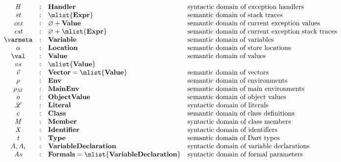\documentclass[a4paper,oneside,fleqn]{article}
\renewcommand{\emptyset}{\varnothing}
\newcommand{\dexpr}{\mathbf{Expr}}
\newcommand{\dhandler}{\mathbf{Handler}}
\newcommand{\denv}{\mathbf{Env}}
\newcommand{\dmenv}{\mathbf{MainEnv}}
\newcommand{\dval}{\mathbf{Value}}
\newcommand{\dlit}{\mathbf{Literal}}
\newcommand{\dvar}{\mathbf{Variable}}
\newcommand{\dvardecl}{\mathbf{VariableDeclaration}}
\newcommand{\dobjval}{\mathbf{ObjectValue}}
\newcommand{\dvector}{\mathbf{Vector}}
\newcommand{\dmember}{\mathbf{Member}}
\newcommand{\dident}{\mathbf{Identifier}}
\newcommand{\idmeta}{\ensuremath{\mathit{X}}}
\newcommand{\dtype}{\mathbf{Type}}
\newcommand{\typemeta}{\ensuremath{\mathit{t}}}
\newcommand{\dclass}{\mathbf{Class}}
\newcommand{\dformals}{\mathbf{Formals}}
\begin{document}
\[\begin{array}{ccll}
    \handler
    & : & \dhandler & \text{syntactic domain of exception handlers} \\
    \strace
    & : & \mlist{\dexpr} & \text{semantic domain of stack traces}\\
    \cex
    & : &  \emptyset + \dval & \text{semantic domain of current exception values}\\
    \cstrace
    & : & \emptyset + \mlist{\dexpr} & \text{semantic domain of current exception stack traces}\\
    \varmeta
    & : & \dvar & \text{semantic domain of variables}\\
    \loc
    & : & \dlocation & \text{semantic domain of store locations}\\
    \val
    & : & \dval & \text{semantic domain of values}\\
    \vals & : & \mlist{\dval} \\
    \vvec & : & \dvector = \mlist{\dval}& \text{semantic domain of vectors}\\
    \env
    & : & \denv & \text{semantic domain of environments}\\
    \mainenv
    & : & \dmenv & \text{semantic domain of main environments}\\
    \obj
    & : & \dobjval & \text{semantic domain of object values}\\
    \lit
    & : & \dlit & \text{syntactic domain of literals}\\
    \classvar
    & : & \dclass & \text{semantic domain of class definitions}\\
    \membermeta
    & : & \dmember & \text{syntactic domain of class members}\\
    \idmeta
    & : & \dident & \text{syntactic domain of identifiers}\\
    \typemeta & : & \dtype & \text{semantic domain of Dart types}\\
    \formal, \formali{i} & : & \dvardecl & \text{syntactic domain of variable declarations} \\
    \formals & : & \dformals = \mlist{\dvardecl} &\text{syntactic domain of formal parameters}\\
  \end{array}
\]

\newcommand{\expressionmeta}{\ensuremath{\mathit{E}}}
\newcommand{\expressionsmeta}{\expressionmeta{s}}
\newcommand{\variablemeta}{\ensuremath{\mathit{x}}}
\newcommand{\boolmeta}{\ensuremath{\mathit{B}}}
\newcommand{\integermeta}{\ensuremath{\mathit{I}}}
\newcommand{\doublemeta}{\ensuremath{\mathit{D}}}
\newcommand{\stringmeta}{\ensuremath{\mathit{S}}}
\newcommand{\statementmeta}{\ensuremath{\mathit{\stmt}}}
\end{document}

